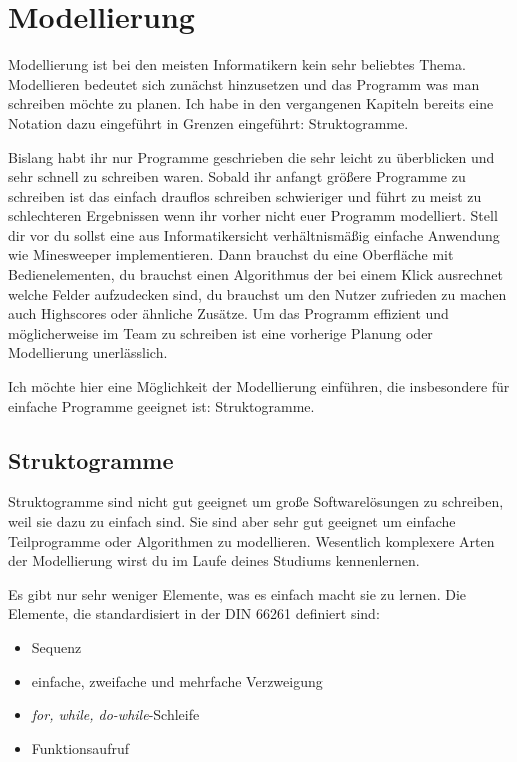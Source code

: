 \chapter{Modellierung}

Modellierung ist bei den meisten Informatikern kein sehr beliebtes Thema. Modellieren bedeutet sich zunächst hinzusetzen und das Programm was man schreiben möchte zu planen. Ich habe in den vergangenen Kapiteln bereits eine Notation dazu eingeführt in Grenzen eingeführt: Struktogramme.

Bislang habt ihr nur Programme geschrieben die sehr leicht zu überblicken und sehr schnell zu schreiben waren. Sobald ihr anfangt größere Programme zu schreiben ist das einfach drauflos schreiben schwieriger und führt zu meist zu schlechteren Ergebnissen wenn ihr vorher nicht euer Programm modelliert. Stell dir vor du sollst eine aus Informatikersicht verhältnismäßig einfache Anwendung wie Minesweeper implementieren. Dann brauchst du eine Oberfläche mit Bedienelementen, du brauchst einen Algorithmus der bei einem Klick ausrechnet welche Felder aufzudecken sind, du brauchst um den Nutzer zufrieden zu machen auch Highscores oder ähnliche Zusätze. Um das Programm effizient und möglicherweise im Team zu schreiben ist eine vorherige Planung oder Modellierung unerlässlich.

Ich möchte hier eine Möglichkeit der Modellierung einführen, die insbesondere für einfache Programme geeignet ist: Struktogramme.

\section{Struktogramme}

Struktogramme sind nicht gut geeignet um große Softwarelösungen zu schreiben, weil sie dazu zu einfach sind. Sie sind aber sehr gut geeignet um einfache Teilprogramme oder Algorithmen zu modellieren. Wesentlich komplexere Arten der Modellierung wirst du im Laufe deines Studiums kennenlernen.

Es gibt nur sehr weniger Elemente, was es einfach macht sie zu lernen. Die Elemente, die standardisiert in der DIN 66261 definiert sind:

\begin{itemize}
	\item Sequenz
	\item einfache, zweifache und mehrfache Verzweigung
	\item \textit{for, while, do-while}-Schleife
	\item Funktionsaufruf
\end{itemize}

